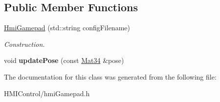 \subsection*{Public Member Functions}
\begin{DoxyCompactItemize}
\item 
\hyperlink{classHmiGamepad_ae89618e8d2c7f5eccd8fd290c2ff09ab}{Hmi\+Gamepad} (std\+::string config\+Filename)\hypertarget{classHmiGamepad_ae89618e8d2c7f5eccd8fd290c2ff09ab}{}\label{classHmiGamepad_ae89618e8d2c7f5eccd8fd290c2ff09ab}

\begin{DoxyCompactList}\small\item\em Construction. \end{DoxyCompactList}\item 
void {\bfseries update\+Pose} (const \hyperlink{namespaceputar_a8bf3c8025ae8f60f553a752014c9849a}{Mat34} \&pose)\hypertarget{classHmiGamepad_ae310fd4190dfc54b15a6c54019464aa4}{}\label{classHmiGamepad_ae310fd4190dfc54b15a6c54019464aa4}

\end{DoxyCompactItemize}


The documentation for this class was generated from the following file\+:\begin{DoxyCompactItemize}
\item 
H\+M\+I\+Control/hmi\+Gamepad.\+h\end{DoxyCompactItemize}
